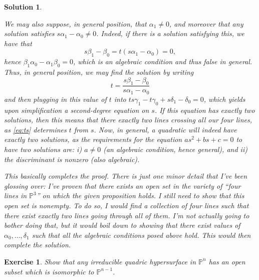 \documentclass{article}
\newtheorem{ex}{Exercise}
\theoremstyle{nonumberplain}
\newtheorem{sol}{Solution}
\newcommand{\PP}{\mathbb{P}}
\begin{document}
\begin{sol}
\begin{enumerate}
We may also suppose, in general position, that $\alpha_1 \neq 0$, and moreover that any solution satisfies $s \alpha_1 - \alpha_0 \neq 0$. Indeed, if there is a solution satisfying this, we have that
\begin{equation}
s \beta_1 - \beta_0 = t(s \alpha_1 - \alpha_0) = 0,
\end{equation}
hence $\beta_1 \alpha_0 - \alpha_1 \beta_0 = 0$, which is an algebraic condition and thus false in general. Thus, in general position, we may find the solution by writing
\begin{equation}\label{eq:ts}
t = \frac{s \beta_1 - \beta_0}{s \alpha_1 - \alpha_0}
\end{equation}
and then plugging in this value of $t$ into $t s \gamma_1 - t \gamma_0 + s \delta_1 - \delta_0 = 0$, which yields upon simplification a second-degree equation on $s$. If this equation has exactly two solutions, then this means that there exactly two lines crossing all our four lines, as \eqref{eq:ts} determines $t$ from $s$. Now, in general, a quadratic will indeed have exactly two solutions, as the requirements for the equation $a s^2 + b s + c = 0$ to have two solutions are: i) $a \neq 0$ (an algebraic condition, hence general), and ii) the discriminant is nonzero (also algebraic).

This basically completes the proof. There is just one minor detail that I've been glossing over: I've proven that there exists an open set in the variety of ``four lines in $\PP^3$'' on which the given proposition holds. I still need to show that this open set is nonempty. To do so, I would find a collection of four lines such that there exist exactly two lines going through all of them. I'm not actually going to bother doing that, but it would boil down to showing that there exist values of $\alpha_0, \dots, \delta_1$ such that all the algebraic conditions posed above hold. This would then complete the solution.
\end{enumerate}
\end{sol}

\begin{ex}
Show that any irreducible quadric hypersurface in $\PP^n$ has an open subset which is isomorphic to $\PP^{n-1}$.
\end{ex}
\end{document}

